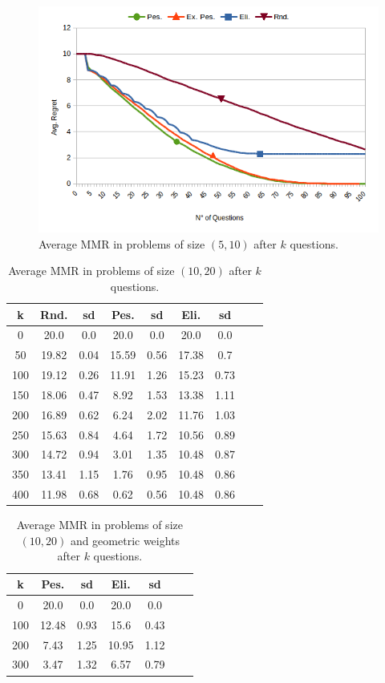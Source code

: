 \documentclass[sigconf, anonymous]{aamas}
\begin{document}
\begin{figure}
	\caption{Average MMR in problems of size $(5, 10)$ after $k$ questions.}
	\label{fig:smallSize}
	\includegraphics[width=.45\textwidth]{comparison.png}
\end{figure}
\begin{table}
	\caption{Average MMR in problems of size $(10, 20)$ after $k$ questions.}
	\label{tab:biggerSize}
	\begin{tabular}{S[table-figures-integer=3, table-number-alignment = right, table-figures-decimal=0]S[table-number-alignment = right]@{ ± }S[table-number-alignment = left]S[table-number-alignment = right]@{ ± }S[table-number-alignment = left]S[table-number-alignment = right]@{ ± }S[table-number-alignment = left]S[table-number-alignment = right]@{ ± }S[table-number-alignment = left]}
		\toprule
		{k} & {Rnd.} & {sd} & {Pes.} & {sd} & {Eli.} & {sd} \\
		 &20.0 & 0.0 & 20.0 & 0.0&  20.0 & 0.0 \\
		50 & 19.82 & 0.04 &	15.59 &0.56	&17.38& 0.7\\
		100 & 19.12	& 0.26&	11.91&	1.26 &15.23& 0.73\\
		150 & 18.06	& 0.47&	8.92&	1.53 &13.38& 1.11\\
		200 & 16.89	& 0.62&6.24&2.02&11.76& 1.03\\
		250 & 15.63 & 0.84&	4.64&1.72&10.56& 0.89\\
		300 & 14.72	& 0.94&	3.01& 1.35 &10.48& 0.87\\
		350 & 13.41	& 1.15& 1.76& 0.95&10.48& 0.86\\
		400 & 11.98	& 0.68&	0.62&0.56 &10.48& 0.86\\
		\bottomrule
	\end{tabular}
\end{table}
\begin{table}
	\caption{Average MMR in problems of size $(10, 20)$ and geometric weights after $k$ questions.}
	\label{tab:geometricWeights}
	\begin{tabular}{S[table-figures-integer=3, table-number-alignment = right, table-figures-decimal=0]S[table-number-alignment = right]@{ ± }S[table-number-alignment = left]S[table-number-alignment = right]@{ ± }S[table-number-alignment = left]S[table-number-alignment = right]@{ ± }S[table-number-alignment = left]}
		\toprule
		{k} & {Pes.} & {sd} & {Eli.} & {sd} \\
			&20.0	&0.0	&20.0	&0.0\\
		100	&12.48	&0.93	&15.6	&0.43\\
		200	&7.43	&1.25	&10.95	&1.12\\
		300	&3.47	&1.32	&6.57	&0.79\\
		\bottomrule
	\end{tabular}
\end{table}
\end{document}
